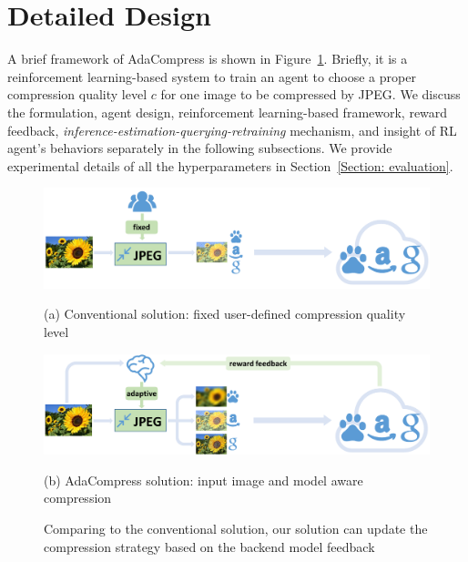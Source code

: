 \section{Detailed Design}
\label{Section: design}

A brief framework of AdaCompress is shown in Figure~\ref{fig: framework}. Briefly, it is a reinforcement learning-based system to train an agent to choose a proper compression quality level $ c $ for one image to be compressed by JPEG. We discuss the formulation, agent design, reinforcement learning-based framework, reward feedback, \emph{inference-estimation-querying-retraining} mechanism, and insight of RL agent's behaviors separately in the following subsections. We provide experimental details of all the hyperparameters in Section~\ref{Section: evaluation}. %

\begin{figure}[!t]
	\begin{minipage}{\linewidth}
		\centerline{\includegraphics[width=0.8\linewidth]{figures/conventional-framework.pdf}}
		\begin{center}
			{(a) Conventional solution: fixed user-defined compression quality level}
		\end{center}
	\end{minipage}
	\vfill
	\vspace{0.4cm}
	\begin{minipage}{\linewidth}
		\centerline{\includegraphics[width=0.8\linewidth]{figures/adaptive-framework.pdf}}
		\vspace{0.2cm}
		\begin{center}
			{(b) AdaCompress solution: input image and model aware compression}
		\end{center}
	\end{minipage}
	\caption{Comparing to the conventional solution, our solution can update the compression strategy based on the backend model feedback}
	\label{fig: framework}
\end{figure}

